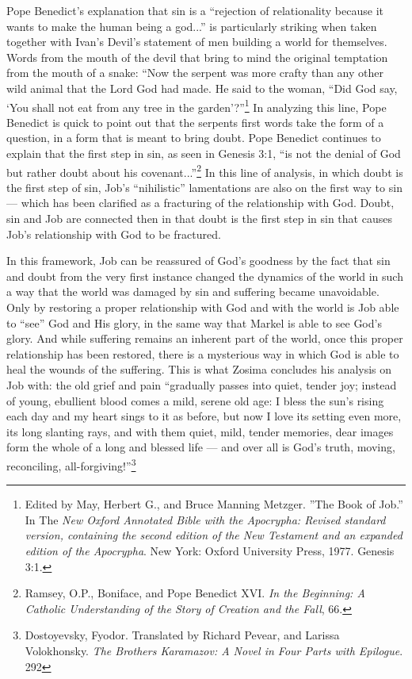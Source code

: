 Pope Benedict's explanation that sin is a ``rejection of relationality because it wants to make the human being a god...'' is particularly striking when taken together with Ivan's Devil's statement of men building a world for themselves. Words from the mouth of the devil that bring to mind the original temptation from the mouth of a snake: ``Now the serpent was more crafty than any other wild animal that the Lord God had made. He said to the woman, ``Did God say, `You shall not eat from any tree in the garden'?''\footnote{Edited by May, Herbert G., and Bruce Manning Metzger. ''The Book of Job.'' In The \emph{New Oxford Annotated Bible with the Apocrypha: Revised standard version, containing the second edition of the New Testament and an expanded edition of the Apocrypha}. New York: Oxford University Press, 1977. Genesis 3:1.} In analyzing this line, Pope Benedict is quick to point out that the serpents first words take the form of a question, in a form that is meant to bring doubt. Pope Benedict continues to explain that the first step in sin, as seen in Genesis 3:1, ``is not the denial of God but rather doubt about his covenant...''\footnote{Ramsey, O.P., Boniface, and Pope Benedict XVI. \emph{In the Beginning: A Catholic Understanding of the Story of Creation and the Fall}, 66.} In this line of analysis, in which doubt is the first step of sin, Job's ``nihilistic'' lamentations are also on the first way to sin --- which has been clarified as a fracturing of the relationship with God. Doubt, sin and Job are connected then in that doubt is the first step in sin that causes Job's relationship with God to be fractured. 

In this framework, Job can be reassured of God's goodness by the fact that sin and doubt from the very first instance changed the dynamics of the world in such a way that the world was damaged by sin and suffering became unavoidable. Only by restoring a proper relationship with God and with the world is Job able to ``see'' God and His glory, in the same way that Markel is able to see God's glory. And while suffering remains an inherent part of the world, once this proper relationship has been restored, there is a mysterious way in which God is able to heal the wounds of the suffering. This is what Zosima concludes his analysis on Job with: the old grief and pain ``gradually passes into quiet, tender joy; instead of young, ebullient blood comes a mild, serene old age: I bless the sun's rising each day and my heart sings to it as before, but now I love its setting even more, its long slanting rays, and with them quiet, mild, tender memories, dear images form the whole of a long and blessed life --- and over all is God's truth, moving, reconciling, all-forgiving!''\footnote{Dostoyevsky, Fyodor. Translated by Richard Pevear, and Larissa Volokhonsky. \emph{The Brothers Karamazov: A Novel in Four Parts with Epilogue}. 292} 

